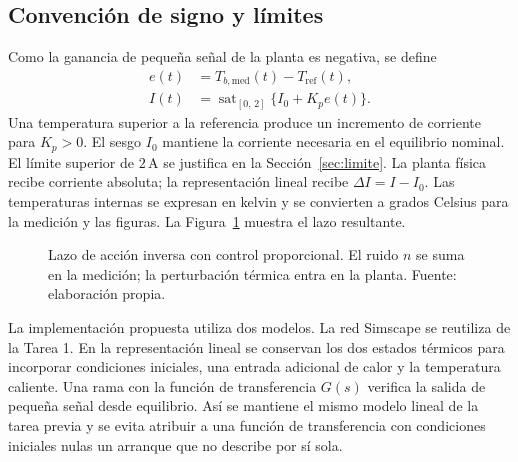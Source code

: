 \documentclass[journal,twocolumn]{IEEEtran}
\begin{document}
\subsection{Convención de signo y límites}
Como la ganancia de pequeña señal de la planta es negativa, se define
\begin{align}
 e(t)&=T_{b,\mathrm{med}}(t)-T_{\mathrm{ref}}(t),\label{eq:error}\\
 I(t)&=\operatorname{sat}_{[0,\,2]}\{I_0+K_p e(t)\}.\label{eq:leyP}
\end{align}
Una temperatura superior a la referencia produce un incremento de corriente para $K_p>0$. El sesgo $I_0$ mantiene la corriente necesaria en el equilibrio nominal. El límite superior de $2\,\mathrm A$ se justifica en la Sección~\ref{sec:limite}. La planta física recibe corriente absoluta; la representación lineal recibe $\Delta I=I-I_0$. Las temperaturas internas se expresan en kelvin y se convierten a grados Celsius para la medición y las figuras. La Figura~\ref{fig:lazoP} muestra el lazo resultante.

\begin{figure}[!tbp]
\centering
{}
\caption{Lazo de acción inversa con control proporcional. El ruido $n$ se suma en la medición; la perturbación térmica entra en la planta. Fuente: elaboración propia.}
\label{fig:lazoP}
\end{figure}

La implementación propuesta utiliza dos modelos. La red Simscape se reutiliza de la Tarea 1. En la representación lineal se conservan los dos estados térmicos para incorporar condiciones iniciales, una entrada adicional de calor y la temperatura caliente. Una rama con la función de transferencia $G(s)$ verifica la salida de pequeña señal desde equilibrio. Así se mantiene el mismo modelo lineal de la tarea previa y se evita atribuir a una función de transferencia con condiciones iniciales nulas un arranque que no describe por sí sola.
\end{document}
